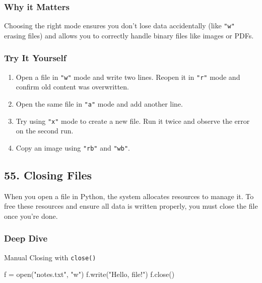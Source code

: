 \documentclass[
  letterpaper,
  DIV=11,
  numbers=noendperiod]{scrreprt}
\newenvironment{Shaded}{\begin{snugshade}}{\end{snugshade}}
\newcommand{\BuiltInTok}[1]{\textcolor[rgb]{0.00,0.23,0.31}{#1}}
\newcommand{\NormalTok}[1]{\textcolor[rgb]{0.00,0.23,0.31}{#1}}
\newcommand{\OperatorTok}[1]{\textcolor[rgb]{0.37,0.37,0.37}{#1}}
\newcommand{\StringTok}[1]{\textcolor[rgb]{0.13,0.47,0.30}{#1}}
\providecommand{\tightlist}{%
  \setlength{\itemsep}{0pt}\setlength{\parskip}{0pt}}
\begin{document}
\subsubsection{Why it Matters}\label{why-it-matters-53}

Choosing the right mode ensures you don't lose data accidentally (like
\texttt{"w"} erasing files) and allows you to correctly handle binary
files like images or PDFs.

\subsubsection{Try It Yourself}\label{try-it-yourself-53}

\begin{enumerate}
\def\labelenumi{\arabic{enumi}.}
\tightlist
\item
  Open a file in \texttt{"w"} mode and write two lines. Reopen it in
  \texttt{"r"} mode and confirm old content was overwritten.
\item
  Open the same file in \texttt{"a"} mode and add another line.
\item
  Try using \texttt{"x"} mode to create a new file. Run it twice and
  observe the error on the second run.
\item
  Copy an image using \texttt{"rb"} and \texttt{"wb"}.
\end{enumerate}

\subsection{55. Closing Files}\label{closing-files}

When you open a file in Python, the system allocates resources to manage
it. To free these resources and ensure all data is written properly, you
must close the file once you're done.

\subsubsection{Deep Dive}\label{deep-dive-54}

Manual Closing with \texttt{close()}

\begin{Shaded}
\begin{Highlighting}[]
\NormalTok{f }\OperatorTok{=} \BuiltInTok{open}\NormalTok{(}\StringTok{"notes.txt"}\NormalTok{, }\StringTok{"w"}\NormalTok{)}
\NormalTok{f.write(}\StringTok{"Hello, file!"}\NormalTok{)}
\NormalTok{f.close()}
\end{Highlighting}
\end{Shaded}
\end{document}
